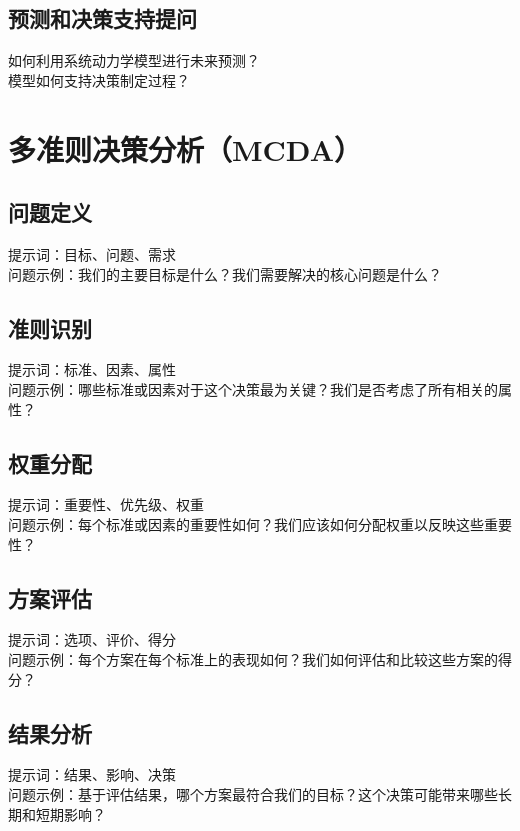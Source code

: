 \documentclass[12pt]{book}
\begin{document}
\subsection{预测和决策支持提问}
如何利用系统动力学模型进行未来预测？\\
模型如何支持决策制定过程？\\



\section{多准则决策分析（MCDA）}
\subsection{问题定义}
提示词：目标、问题、需求\\
问题示例：我们的主要目标是什么？我们需要解决的核心问题是什么？\\

\subsection{准则识别}
提示词：标准、因素、属性\\
问题示例：哪些标准或因素对于这个决策最为关键？我们是否考虑了所有相关的属性？\\

\subsection{权重分配}
提示词：重要性、优先级、权重\\
问题示例：每个标准或因素的重要性如何？我们应该如何分配权重以反映这些重要性？\\

\subsection{方案评估}
提示词：选项、评价、得分\\
问题示例：每个方案在每个标准上的表现如何？我们如何评估和比较这些方案的得分？\\

\subsection{结果分析}
提示词：结果、影响、决策\\
问题示例：基于评估结果，哪个方案最符合我们的目标？这个决策可能带来哪些长期和短期影响？\\
\end{document}
